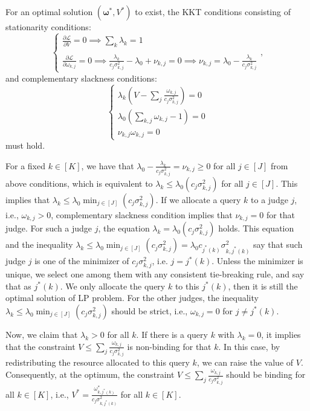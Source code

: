 \documentclass{article}
\theoremstyle{plain}
\theoremstyle{definition}
\theoremstyle{plain}
\begin{document}
For an optimal solution $(\bm{\omega}^*, V^*)$ to exist, the KKT conditions consisting of stationarity conditions:
\begin{equation}
    \begin{cases}
        \frac{\partial \mathcal{L}}{\partial V} = 0 \implies \sum_k \lambda_k = 1\\
        \\
        \frac{\partial \mathcal{L}}{\partial \omega_{k,j}} = 0 \implies \frac{\lambda_k}{c_j \sigma_{k,j}^2} - \lambda_0 + \nu_{k,j} = 0 \implies \nu_{k,j} = \lambda_0 - \frac{\lambda_k}{c_j \sigma_{k,j}^2}
    \end{cases},
\end{equation}
and complementary slackness conditions:
\begin{equation}
    \begin{cases}
        \lambda_k \left( V - \sum_{j} \frac{\omega_{k,j}}{c_j \sigma_{k,j}^2} \right) = 0 \\
        \lambda_0 \left( \sum_{k,j} \omega_{k,j} - 1 \right) = 0\\
        \nu_{k,j} \omega_{k,j} = 0
    \end{cases}
\end{equation}
must hold.

For a fixed $k\in [K]$, we have that $\lambda_0 - \frac{\lambda_k}{c_j \sigma_{k,j}^2} =\nu_{k,j} \geq 0$ for all $j\in[J]$ from above conditions, which is equivalent to $\lambda_k \leq \lambda_0 (c_j \sigma_{k,j}^2)$ for all $j \in [J]$.
This implies that $\lambda_k \leq \lambda_0 \min_{j\in[J]} (c_j \sigma_{k,j}^2 )$.
If we allocate a query $k$ to a judge $j$, i.e., $\omega_{k,j} > 0$, complementary slackness condition implies that $\nu_{k,j} = 0$ for that judge.
For such a judge $j$, the equation $\lambda_k = \lambda_0 (c_j \sigma_{k,j}^2)$ holds.
This equation and the inequality $\lambda_k \leq \lambda_0 \min_{j\in[J]} (c_j \sigma_{k,j}^2 ) = \lambda_0 c_{j^*(k)}\sigma_{k, j^*(k)}^2$ say that such judge $j$ is one of the minimizer of $c_j \sigma_{k,j}^2$, i.e. $j = j^*(k)$. 
Unless the minimizer is unique, we select one among them with any consistent tie-breaking rule, and say that as $j^*(k)$.
We only allocate the query $k$ to this $j^*(k)$, then it is still the optimal solution of LP problem.
For the other judges, the inequality $\lambda_k \leq \lambda_0 \min_{j\in[J]} (c_j \sigma_{k,j}^2 )$ should be strict, i.e., $\omega_{k,j}=0$ for $j \neq j^*(k)$.


Now, we claim that $\lambda_k > 0$ for all $k$.
If there is a query $k$ with $\lambda_k = 0$, it implies that the constraint $V \leq \sum_j \frac{\omega_{k,j}}{c_j \sigma_{k,j}^2}$ is non-binding for that $k$.
In this case, by redistributing the resource allocated to this query $k$, we can raise the value of $V$.
Consequently, at the optimum, the constraint $V \leq \sum_j \frac{\omega_{k,j}}{c_j \sigma_{k,j}^2}$ should be binding for all $k\in[K]$, i.e., $V^* =  \frac{\omega_{k,j^*(k)}^*}{c_j \sigma_{k,j^*(k)}^2}$ for all $k\in[K]$.
\end{document}
